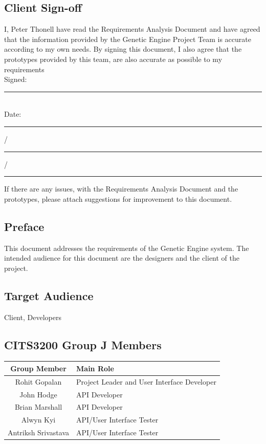 \subsection*{Client Sign-off}
I, Peter Thonell have read the Requirements Analysis Document and have agreed that the information provided by the Genetic Engine Project Team is accurate according to my own needs. By signing this document, I also agree that the prototypes provided by this team, are also accurate as possible to my requirements
\\[10pt]
Signed: \rule{3cm}{.7pt}
\\[10pt]
Date: \rule{0.8cm}{.7pt} \slash \rule{0.8cm}{.7pt} \slash \rule{3cm}{.7pt}

If there are any issues, with the Requirements Analysis Document and the prototypes, please attach suggestions for improvement to this document.


\subsection*{Preface}
This document addresses the requirements of the Genetic Engine system. The intended audience for this document are the designers and the client of the project.

\subsection*{Target Audience}
Client, Developers

\subsection*{CITS3200 Group J Members}
\begin{tabular}{c l}
 Group Member & Main Role \\
 \hline \hline
 Rohit Gopalan & Project Leader and User Interface Developer \\ \hline
 John Hodge & API Developer \\ \hline
 Brian Marshall & API Developer \\ \hline
 Alwyn Kyi & API/User Interface Tester \\ \hline
 Antriksh Srivastava & API/User Interface Tester\\ \hline
\end{tabular}

